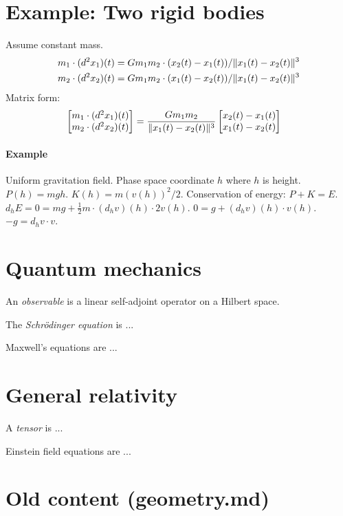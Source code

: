 \section{Example: Two rigid bodies}

Assume constant mass.
\begin{align*}
    m_1 \cdot (d^2 x_1)(t) &= G m_1 m_2 \cdot (x_2(t) - x_1(t)) / \lVert x_1(t) - x_2(t)\rVert^3
    \\
    m_2 \cdot (d^2 x_2)(t) &= G m_1 m_2 \cdot (x_1(t) - x_2(t)) / \lVert x_1(t) - x_2(t)\rVert^3
\end{align*}
Matrix form:
\begin{align*}
    \begin{bmatrix}
        m_1 \cdot (d^2 x_1)(t)
        \\
        m_2 \cdot (d^2 x_2)(t)
    \end{bmatrix}
    &=
    \frac{G m_1 m_2}{\lVert x_1(t) - x_2(t)\rVert^3}
    \begin{bmatrix}
        x_2(t) - x_1(t)
        \\
        x_1(t) - x_2(t)
    \end{bmatrix}
\end{align*}

\paragraph{Example}
Uniform gravitation field.
Phase space coordinate \(h\) where \(h\) is height.
\(P(h) = m g h\).
\(K(h) = m (v(h))^2 / 2\).
Conservation of energy: \(P + K = E\).
\(d_h E = 0 = m g + \frac{1}{2} m \cdot (d_h v)(h) \cdot 2 v(h)\).
\(0 = g + (d_h v)(h) \cdot v(h)\).
\(- g = d_h v \cdot v\).

\section{Quantum mechanics}

%
An \emph{observable} is a linear self-adjoint operator on a Hilbert space.

%
The \emph{Schr\"odinger equation} is ...

%
Maxwell's equations are ...

\section{General relativity}

%
A \emph{tensor} is ...

%
Einstein field equations are ...

\section{Old content (geometry.md)}

